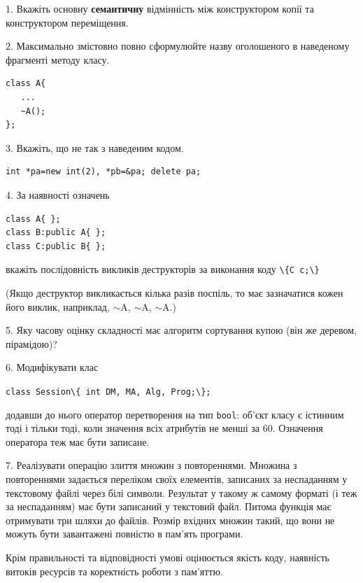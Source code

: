 \documentclass[12pt, ukrainian]{article}
\def\code#1{\Verb!#1!}
\begin{document}
{%
1. Вкажіть основну \textbf{семантичну} відмінність між конструктором копії та конструктором переміщення.%
\par
\vspace{2mm}
2. Максимально змістовно повно сформулюйте назву оголошеного в наведеному фрагменті методу класу.
\vspace{-3mm}
\begin{verbatim}class A{
   ...
   ~A();
};\end{verbatim}
\vspace{-3mm}
\par
\vspace{2mm}
3. Вкажіть, що не так з наведеним кодом.
\vspace{-3mm}
\begin{verbatim}int *pa=new int(2), *pb=&pa; delete pa;\end{verbatim}
\vspace{-3mm}
\par
\vspace{2mm}
4. За наявності означень
\vspace{-3mm}
\begin{verbatim}
class A{ };
class B:public A{ };
class C:public B{ };\end{verbatim}
\vspace{-3mm}
вкажіть послідовність викликів деструкторів за виконання коду \code{\{C c;\}} 

(Якщо деструктор викликається кілька разів поспіль, то має зазначатися кожен його виклик, наприклад, $\sim$A, $\sim$A, $\sim$A.)

\vspace{2mm}
5. Яку часову оцінку складності має алгоритм сортування купою (він же деревом, пірамідою)?
\par
\vspace{2mm}
6. Модифікувати клас 

\qquad\code{class Session\{ int DM, MA, Alg, Prog;\};} 


додавши до нього оператор перетворення на тип \code{bool}: об'єкт класу є істинним тоді і тільки тоді, коли значення всіх атрибутів не менші за 60. Означення оператора теж має бути записане.%
\par
\vspace{2mm}
7. 
Реалізувати операцію злиття множин з повтореннями. Множина з повтореннями задається переліком своїх елементів, записаних за неспаданням у текстовому файлі через білі символи. Результат у такому ж самому форматі (і теж за неспаданням) має бути записаний у текстовий файл. Питома функція має отримувати три шляхи до файлів. Розмір вхідних множин такий, що вони не можуть бути завантажені повністю в пам’ять програми.

Крім правильності та відповідності умові оцінюється якість коду, наявність витоків ресурсів та коректність роботи з пам'яттю. 

}
\end{document}
